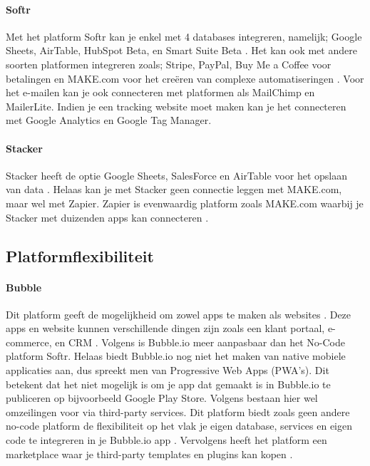 \paragraph{Softr}
Met het platform Softr kan je enkel met 4 databases integreren, namelijk; Google Sheets, AirTable, HubSpot Beta, en Smart Suite Beta \autocite{Frater2024}. 
Het kan ook met andere soorten platformen integreren zoals; Stripe, PayPal, Buy Me a Coffee voor betalingen en MAKE.com voor het creëren van complexe automatiseringen \autocite{Code2023} \autocite{Youssef2023}. 
Voor het e-mailen kan je ook connecteren met platformen als MailChimp en MailerLite. Indien je een tracking website moet maken kan je het connecteren met Google Analytics en Google Tag Manager.
\paragraph{Stacker}
Stacker heeft de optie Google Sheets, SalesForce en AirTable voor het opslaan van data \autocite{Englert2021} \autocite{JDN2023} \autocite{Youssef2023}. 
Helaas kan je met Stacker geen connectie leggen met MAKE.com, maar wel met Zapier. 
Zapier is evenwaardig platform zoals MAKE.com waarbij je Stacker met duizenden apps kan connecteren \autocite{Zapier}.
\subsection{Platformflexibiliteit}%
\label{subsec:platformflexibiliteit}

\paragraph{Bubble}
Dit platform geeft de mogelijkheid om zowel apps te maken als websites \autocite{Youssef2023}. 
Deze apps en website kunnen verschillende dingen zijn zoals een klant portaal, e-commerce, en CRM \autocite{Sharma2022}. 
Volgens \textcite{Youssef2023} is Bubble.io meer aanpasbaar dan het No-Code platform Softr. Helaas biedt Bubble.io nog niet het maken van native mobiele applicaties aan, dus spreekt men van Progressive Web Apps (PWA’s). 
Dit betekent dat het niet mogelijk is om je app dat gemaakt is in Bubble.io te publiceren op bijvoorbeeld Google Play Store. Volgens \textcite{Sharma2022} bestaan hier wel omzeilingen voor via third-party services. Dit platform biedt zoals geen andere no-code platform de flexibiliteit op het vlak je eigen database, services en eigen code te integreren in je Bubble.io app \autocite{Bas2024}. 
Vervolgens heeft het platform een marketplace waar je third-party templates en plugins kan kopen \autocite{Sharma2022}. 
